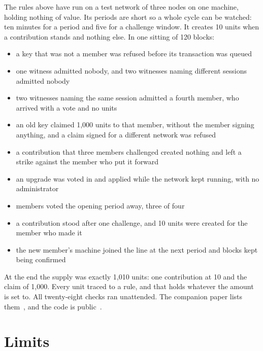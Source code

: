 \documentclass[11pt,a4paper]{article}
\begin{document}
The rules above have run on a test network of three nodes on one machine, holding nothing of value. Its periods are short so a whole cycle can be watched: ten minutes for a period and five for a challenge window. It creates 10 units when a contribution stands and nothing else. In one sitting of 120 blocks:

\begin{itemize}
  \item a key that was not a member was refused before its transaction was queued
  \item one witness admitted nobody, and two witnesses naming different sessions admitted nobody
  \item two witnesses naming the same session admitted a fourth member, who arrived with a vote and no units
  \item an old key claimed 1,000 units to that member, without the member signing anything, and a claim signed for a different network was refused
  \item a contribution that three members challenged created nothing and left a strike against the member who put it forward
  \item an upgrade was voted in and applied while the network kept running, with no administrator
  \item members voted the opening period away, three of four
  \item a contribution stood after one challenge, and 10 units were created for the member who made it
  \item the new member's machine joined the line at the next period and blocks kept being confirmed
\end{itemize}

At the end the supply was exactly 1,010 units: one contribution at 10 and the claim of 1,000. Every unit traced to a rule, and that holds whatever the amount is set to. All twenty-eight checks ran unattended. The companion paper lists them~\cite{seedstech}, and the code is public~\cite{seedscode}.

\section{Limits}
\label{sec:limits}
\end{document}
